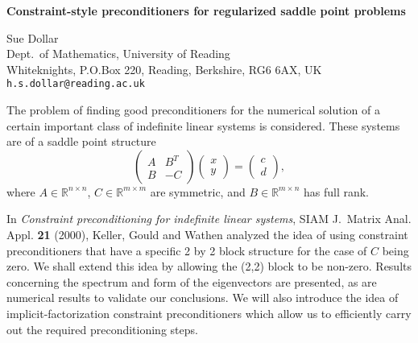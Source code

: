 \documentclass{report}
\newcommand{\Reals}{\mathbb{R}}
\newcommand{\Vecc}[2]{ \left(
	\begin{array}{c}
	#1 \\ #2
	\end{array}
	\right) }
\newcommand{\Matrr}[4]{ \left(
	\begin{array}{cc}
	#1 & #2 \\
	#3 & #4
	\end{array}
	\right) }
\begin{document}

\begin{center}
{\large
{\bf Constraint-style preconditioners for regularized saddle point problems}}

	Sue Dollar \\
	Dept.~of Mathematics, University of Reading \\
	Whiteknights, P.O.Box 220, Reading, Berkshire, RG6 6AX, UK
	\\ {\tt h.s.dollar@reading.ac.uk}
\end{center}
The problem of finding good preconditioners for the numerical
solution of a certain important class of indefinite linear
systems is considered. These systems are of a saddle point
structure
$$ \Matrr{A}{B^T}{B}{-C} \Vecc{x}{y} = \Vecc{c}{d}, $$
where $A\in\Reals^{n\times n}$,
$C\in\Reals^{m\times m}$ are symmetric,
and $B\in\Reals^{m\times n}$ has full rank.

In {\em
Constraint preconditioning for indefinite linear systems},
SIAM J.~Matrix Anal. Appl. {\bf 21} (2000),
Keller, Gould and Wathen analyzed the idea of
using constraint preconditioners that have a
specific 2 by 2 block structure for the case of
$C$ being zero. We
shall extend this idea by allowing the (2,2) block to be
non-zero. Results concerning the spectrum and form of the
eigenvectors are presented, as are numerical results to validate
our conclusions.
We will also introduce the idea of
implicit-factorization constraint preconditioners which allow us
to efficiently carry out the required preconditioning steps.



\end{document}
